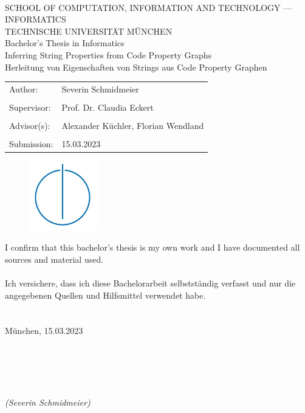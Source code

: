 \documentclass[footsepline,footinclude=false,oneside,fontsize=11pt,paper=a4,listof=totoc,bibliography=totoc]{scrbook} %
\newcommand{\thesistitle}{Inferring String Properties from Code Property Graphs}
\newcommand{\name}{Severin Schmidmeier}
\newcommand{\submission}{15.03.2023}
\begin{document}
\begin{center}
	\bigskip \bigskip \bigskip 
	\oTUM{5.0cm} \\
	\vspace*{0.8cm}
	{\huge SCHOOL OF COMPUTATION, INFORMATION AND TECHNOLOGY --- INFORMATICS} \\
	\bigskip \bigskip 
	{\Large TECHNISCHE UNIVERSIT\"AT M\"UNCHEN} \\
	\bigskip \bigskip \bigskip \bigskip
	{\Large Bachelor's Thesis in Informatics} \\
	\bigskip \bigskip \bigskip \bigskip
	{\Large \thesistitle} \\   
	\bigskip \bigskip
	{\Large Herleitung von Eigenschaften von Strings aus Code Property Graphen} \\
	\bigskip
\vfill

\begin{tabular}{ll}
{\large Author:} & {\large \name} \\\\
{\large Supervisor:} & {\large Prof. Dr. Claudia Eckert} \\\\
{\large Advisor(s):} & {\large Alexander K\"uchler, Florian Wendland} \\\\
{\large Submission:} & {\large \submission}
\end{tabular}\bigskip

\begin{figure}[htbp]
\centering \includegraphics[width=3cm]{logos/infologo.jpg}
\end{figure}
\bigskip
\end{center}

\newpage	
\thispagestyle{empty}
\hoffset=0mm
\vspace*{\fill}
\noindent I confirm that this bachelor's thesis is my own work and I have documented all sources and material used.\\\\
Ich versichere, dass ich diese Bachelorarbeit selbstst\"andig verfasst und nur die angegebenen Quellen und Hilfsmittel verwendet habe.\\\\\\
M\"unchen, \submission\\\\\\\\\\\\
\noindent \textit{(\name)}
\end{document}
